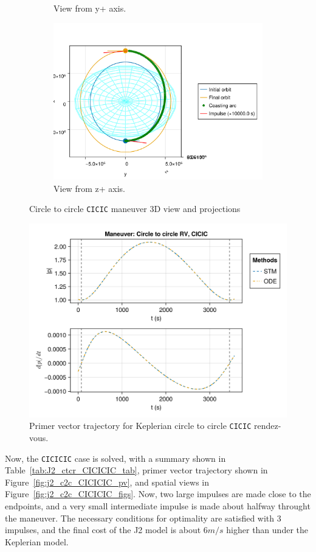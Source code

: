 \begin{figure}[htbp]
\begin{subfigure}{0.49\linewidth}
        \caption{View from y+ axis.}
    \end{subfigure}
    \begin{subfigure}{0.49\linewidth}
        \includegraphics[width=0.8\linewidth]{../results/j2/hohmann/CICIC_z+.png}
        \caption{View from z+ axis.}
    \end{subfigure}
    \caption{Circle to circle \texttt{CICIC} maneuver 3D view and projections}
    \label{fig:j2_c2c_CICIC_figs}
\end{figure}

\begin{figure}[htbp]
    \centering
    \includegraphics[width=0.7\linewidth]{../results/j2/hohmann/CICIC_primer_vector.png}
    \caption{Primer vector trajectory for Keplerian circle to circle \texttt{CICIC} rendez-vous.}
    \label{fig:j2_c2c_CICIC_pv}
\end{figure}
\FloatBarrier
Now, the \texttt{CICICIC} case is solved, with a summary shown in Table~\ref{tab:J2_ctcr_CICICIC_tab}, primer vector trajectory shown in Figure~\ref{fig:j2_c2c_CICICIC_pv}, and spatial views in Figure~\ref{fig:j2_c2c_CICICIC_figs}. Now, two large impulses are made close to the endpoints, and a very small intermediate impulse is made about halfway throught the maneuver. The necessary conditions for optimality are satisfied with 3 impulses, and the final cost of the J2 model is about \(6 m/s\) higher than under the Keplerian model.

